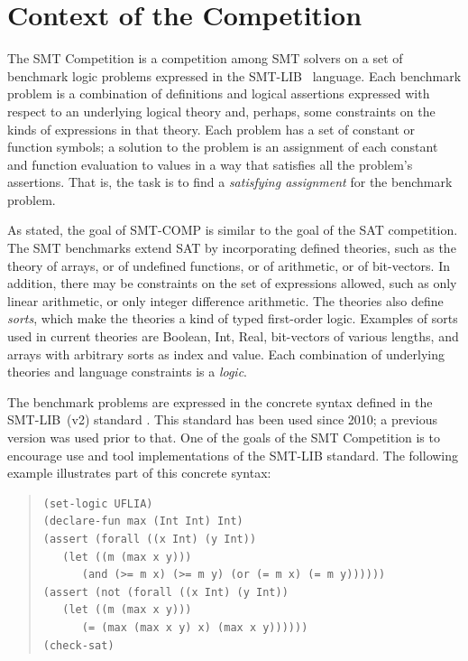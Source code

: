 \documentclass[twoside,11pt]{article}
\begin{document}
\section{Context of the Competition}
\label{sec:context}

The SMT Competition is a competition among SMT solvers on a set of benchmark logic problems expressed in the SMT-LIB~\cite{BarST-RR-10} language. Each benchmark problem is a combination of definitions and logical assertions expressed with respect to an underlying logical theory and, perhaps, some constraints on the kinds of expressions in that theory. Each problem has a set of constant or function symbols; a solution to the problem is an assignment of each constant and function evaluation to values in a way that satisfies all the problem's assertions. That is, the task is to find a \emph{satisfying assignment} for the benchmark problem.

As stated, the goal of SMT-COMP is similar to the goal of the SAT competition. The SMT benchmarks extend SAT by incorporating defined theories, such as the theory of arrays, or of undefined functions, or of arithmetic, or of bit-vectors. In addition, there may be constraints on the set of expressions allowed, such as only linear arithmetic, or only integer difference arithmetic. The theories also define \emph{sorts}, which make the theories a kind of typed first-order logic. Examples of sorts used in current theories are Boolean, Int, Real, bit-vectors of various lengths, and arrays with arbitrary sorts as index and value. Each combination of underlying theories and language constraints is a \emph{logic}.

The benchmark problems are expressed in the concrete syntax defined in the SMT-LIB~(v2) standard \cite{BarST-RR-10}. This standard has been used since 2010; a previous version was used prior to that. One of the goals of the SMT Competition is to encourage use and tool implementations of the SMT-LIB standard. The following example illustrates part of this concrete syntax:

\begin{minipage}{\textwidth}
\begin{quote}
\lstset{frameround=fttt}
\begin{lstlisting}[frame=trBL]
(set-logic UFLIA)
(declare-fun max (Int Int) Int)
(assert (forall ((x Int) (y Int))
   (let ((m (max x y)))
      (and (>= m x) (>= m y) (or (= m x) (= m y))))))
(assert (not (forall ((x Int) (y Int))
   (let ((m (max x y)))
      (= (max (max x y) x) (max x y))))))
(check-sat)
\end{lstlisting}
\end{quote}
\end{minipage}
\end{document}
